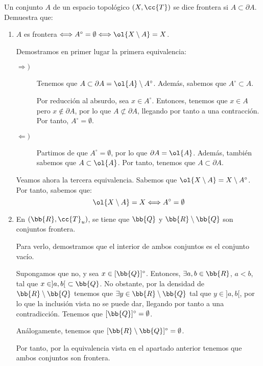 \begin{ejercicio}
    Un conjunto $A$ de un espacio topológico $(X,\cc{T})$ se dice frontera si $A\subset \partial A$. Demuestra que:
    \begin{enumerate}
        \item $A$ es frontera $\Longleftrightarrow A^\circ =\emptyset \Longleftrightarrow \ol{X\setminus A}=X$.

        Demostramos en primer lugar la primera equivalencia:
        \begin{description}
            \item[$\Longrightarrow)$] Tenemos que $A\subset \partial A=\ol{A}\setminus A^\circ$. Además, sabemos que $A^\circ \subset A$.

            Por reducción al absurdo, sea $x\in A^\circ$. Entonces, tenemos que $x\in A$ pero $x\notin \partial A$, por lo que $A\not \subset \partial A$, llegando por tanto a una contracción. Por tanto, $A^\circ = \emptyset$.

            \item[$\Longleftarrow)$] Partimos de que $A^\circ = \emptyset$, por lo que $\partial A=\ol{A}$. Además, también sabemos que $A\subset \ol{A}$. Por tanto, tenemos que $A\subset \partial A$.
        \end{description}

        Veamos ahora la tercera equivalencia. Sabemos que $\ol{X\setminus A}=X\setminus A^\circ$. Por tanto, sabemos que:
        \begin{equation*}
            \ol{X\setminus A}=X
            \Longleftrightarrow 
            A^\circ =\emptyset 
        \end{equation*}
        
        \item En $(\bb{R}, \cc{T}_u)$, se tiene que $\bb{Q}$ y $\bb{R}\setminus \bb{Q}$ son conjuntos frontera.

        Para verlo, demostramos que el interior de ambos conjuntos es el conjunto vacío.

        Supongamos que no, y sea $x\in [\bb{Q}]^\circ$. Entonces, $\exists a,b\in \bb{R}$, $a<b$, tal que $x\in ]a,b[~\subset \bb{Q}$. No obstante, por la densidad de $\bb{R}\setminus \bb{Q}$ tenemos que $\exists y\in \bb{R}\setminus \bb{Q}$ tal que $y\in ]a,b[$, por lo que la inclusión vista no se puede dar, llegando por tanto a una contradicción. Tenemos que $[\bb{Q}]^\circ=\emptyset$.

        Análogamente, tenemos que $[\bb{R}\setminus \bb{Q}]^\circ=\emptyset$.

        Por tanto, por la equivalencia vista en el apartado anterior tenemos que ambos conjuntos son frontera.
    \end{enumerate}
\end{ejercicio}

